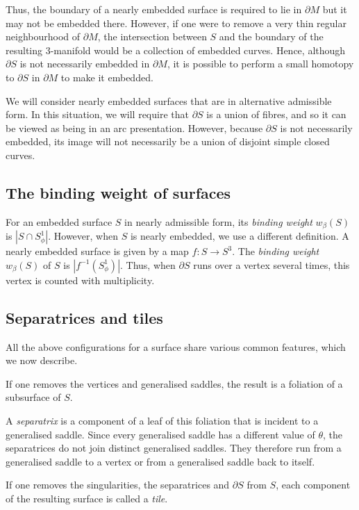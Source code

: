 \documentclass[oneside]{amsart}
\numberwithin{equation}{section}
\theoremstyle{plain}
\theoremstyle{definition}
\begin{document}
Thus, the boundary of a nearly embedded surface is required to lie in $\partial M$ but it
may not be embedded there. However, if one were to remove a very thin regular neighbourhood
of $\partial M$, the intersection between $S$ and the boundary of the resulting 3-manifold
would be a collection of embedded curves. Hence, although $\partial S$ is not necessarily
embedded in $\partial M$, it is possible to perform a small homotopy to $\partial S$ in $\partial M$ to
make it embedded.

We will consider nearly embedded surfaces that are in alternative admissible form.
In this situation, we will require that $\partial S$ is a union of fibres, and so
it can be viewed as being in an arc presentation. However, because $\partial S$
is not necessarily embedded, its image will not necessarily be a union of disjoint
simple closed curves.

\subsection{The binding weight of surfaces}

For an embedded surface $S$ in nearly admissible form, its \emph{binding weight} $w_\beta(S)$ is $|S \cap S^1_\phi|$.
However, when $S$ is nearly embedded, we use a different definition. A nearly embedded surface
is given by a map $f \colon S \rightarrow S^3$. The \emph{binding weight} $w_\beta(S)$ of $S$ is $|f^{-1}(S^1_\phi)|$.
Thus, when $\partial S$ runs over a vertex several times, this vertex is counted with multiplicity.

\subsection{Separatrices and tiles}

All the above configurations for a surface share various common features, which we now describe.

If one removes the vertices and generalised saddles, the result
is a foliation of a subsurface of $S$.

A \emph{separatrix} is a component of a leaf of this foliation that is incident to a generalised saddle. Since every 
generalised saddle has a different value of $\theta$, the separatrices do not join distinct generalised saddles.
They therefore run from a generalised saddle to a vertex or from a generalised saddle back to itself.

If one removes the singularities, the separatrices and $\partial S$ from $S$, each component of
the resulting surface is called a \emph{tile}.
\end{document}
